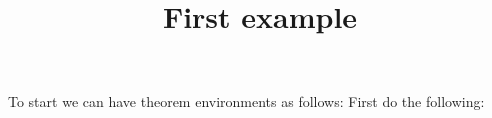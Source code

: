\documentclass{ximera}
\title{First example}
\begin{document}
\maketitle

To start we can have theorem environments as follows:
First do the following:
\end{document}
